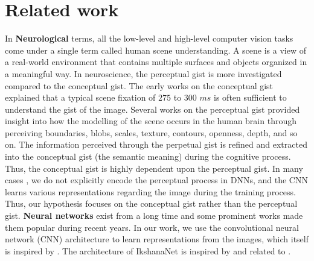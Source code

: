 \documentclass{article}
\begin{document}
\section{Related work}
\label{related work}
In \textbf{Neurological} terms, all the low-level and high-level computer vision tasks come under a single term called human scene understanding. A scene is a view of a real-world environment that contains multiple surfaces and objects organized in a meaningful way. In neuroscience, the perceptual gist is more investigated compared to the conceptual gist. The early works on the conceptual gist \cite{potter1975meaning,intraub1981rapid} explained that a typical scene fixation of $275$ to $300$ $ms$ is often sufficient to understand the gist of the image. Several works on the perceptual gist \cite{biederman1987recognition,rayner1998eye,schyns1994blobs,oliva1997coarse,oliva2000diagnostic,oliva2001modeling,henderson2003human,evans2005perception,fei2007we} provided insight into how the modelling of the scene occurs in the human brain through perceiving boundaries, blobs, scales, texture, contours, openness, depth, and so on. The information perceived through the perpetual gist is refined and extracted into the conceptual gist (the semantic meaning) during the cognitive process. Thus, the conceptual gist is highly dependent upon the perceptual gist.
In many cases \cite{deng2009imagenet,cordts2016cityscapes,8100027}, we do not explicitly encode the perceptual process in DNNs, and the CNN learns various representations regarding the image during the training process. Thus, our hypothesis focuses on the conceptual gist rather than the perceptual gist. \newline
\textbf{Neural networks} exist from a long time  \cite{mcculloch1943logical,rumelhart1986learning,rosenblatt1958perceptron} and some prominent works  \cite{deng2009imagenet,krizhevsky25hinton,lin2013network,simonyan2014very,7298594,he2016deep,44903,8099678} made them popular during recent years. In our work, we use the convolutional neural network (CNN) architecture  \cite{lecun1998gradient,21701} to learn representations from the images, which itself is inspired by \cite{hubel1962receptive,fukushima1983neocognitron}. The architecture of IkshanaNet is inspired by \cite{simonyan2014very,huang2017densely} and related to \cite{huang2018multiscale,liao2016bridging}.\newline
\end{document}
